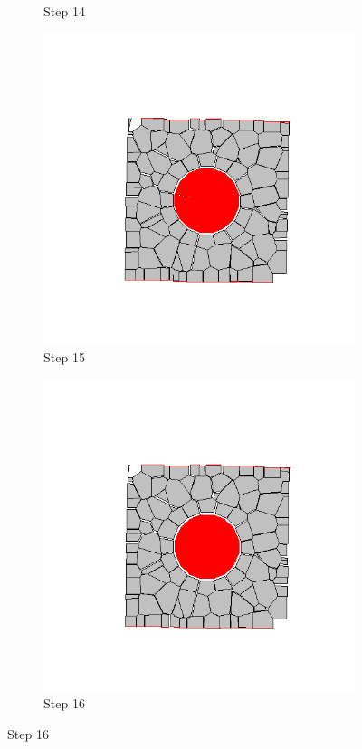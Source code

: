 \begin{figure}[ht!]
\begin{subfigure}{.25\textwidth}
      \caption{Step 14}
      \end{subfigure}%
      \begin{subfigure}{.25\textwidth}
        \centering
        \includegraphics[width=1.0\linewidth]{Files/Small_ASR/CR/DEP5-STEP(015).png}
      \caption{Step 15}
      \end{subfigure}%
      \begin{subfigure}{.25\textwidth}
        \centering
        \includegraphics[width=1.0\linewidth]{Files/Small_ASR/CR/DEP5-STEP(016).png}
      \caption{Step 16}
      \end{subfigure}


\end{figure}
